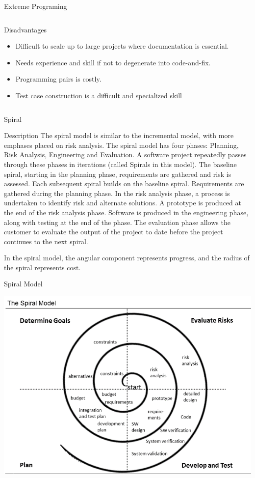 \documentclass[final,hyperref={pdfpagelabels=false}]{beamer}
\begin{document}
\begin{frame}{Extreme Programing}
\begin{columns}[t]
\begin{column}{.48\linewidth}
\begin{block}{Disadvantages}
\begin{itemize}
          \item Difficult to scale up to large projects where
                documentation is essential.
          \item Needs experience and skill if not to degenerate into
                code-and-fix.
          \item Programming pairs is costly.
          \item Test case construction is a difficult and specialized
                skill
          \end{itemize}
        \end{block}
      \end{column}
    \end{columns}
  \end{frame} 
  
  \begin{frame}{Spiral}
        \begin{block}{\large Description}
            \centering
            The spiral model is similar to the incremental model, with
            more emphases placed on risk analysis. The spiral model
            has four phases: Planning, Risk Analysis, Engineering and
            Evaluation. A software project repeatedly passes through
            these phases in iterations (called Spirals in this
            model). The baseline spiral, starting in the planning
            phase, requirements are gathered and risk is
            assessed. Each subsequent spiral builds on the baseline
            spiral. Requirements are gathered during the planning
            phase. In the risk analysis phase, a process is undertaken
            to identify risk and alternate solutions. A prototype is
            produced at the end of the risk analysis phase. Software is
            produced in the engineering phase, along with testing at
            the end of the phase. The evaluation phase allows the
            customer to evaluate the output of the project to date
            before the project continues to the next spiral.
            
            In the spiral model, the angular component represents
            progress, and the radius of the spiral represents cost.
        \end{block}
        \vfill
    \begin{block}{\large Spiral Model}
      \centering
      
        \includegraphics[width=.5\linewidth]{Spiral}
       

\end{block}
\end{frame}
\end{document}

